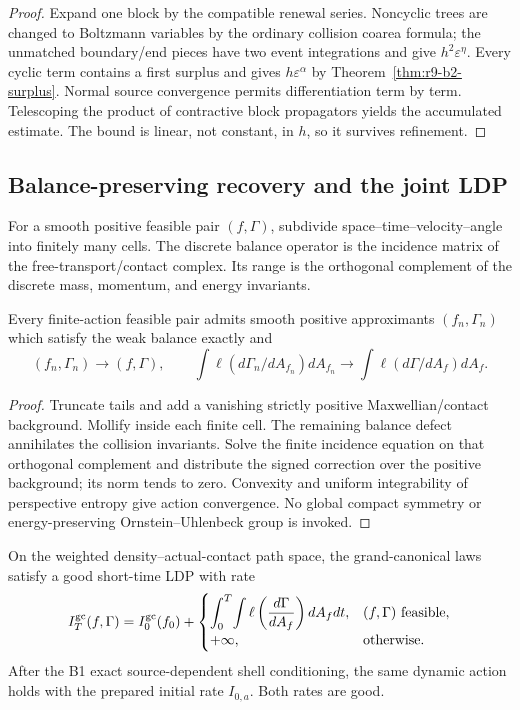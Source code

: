 \begin{proof}
Expand one block by the compatible renewal series.  Noncyclic trees are
changed to Boltzmann variables by the ordinary collision coarea formula; the
unmatched boundary/end pieces have two event integrations and give
$h^2\varepsilon^\eta$.  Every cyclic term contains a first surplus and gives
$h\varepsilon^\alpha$ by Theorem~\ref{thm:r9-b2-surplus}.  Normal source
convergence permits differentiation term by term.  Telescoping the product of
contractive block propagators yields the accumulated estimate.  The bound is
linear, not constant, in $h$, so it survives refinement.
\end{proof}

\subsection{Balance-preserving recovery and the joint LDP}

For a smooth positive feasible pair $(f,\Gamma)$, subdivide
space--time--velocity--angle into finitely many cells.  The discrete balance
operator is the incidence matrix of the free-transport/contact complex.  Its
range is the orthogonal complement of the discrete mass, momentum, and energy
invariants.

\begin{lemma}
\label{lem:r9-b2-repair}
Every finite-action feasible pair admits smooth positive approximants
$(f_n,\Gamma_n)$ which satisfy the weak balance exactly and
\[
 (f_n,\Gamma_n)\to(f,\Gamma),
 \qquad
 \int\ell(d\Gamma_n/dA_{f_n})dA_{f_n}\to
 \int\ell(d\Gamma/dA_f)dA_f.
\]
\end{lemma}

\begin{proof}
Truncate tails and add a vanishing strictly positive Maxwellian/contact
background.  Mollify inside each finite cell.  The remaining balance defect
annihilates the collision invariants.  Solve the finite incidence equation on
that orthogonal complement and distribute the signed correction over the
positive background; its norm tends to zero.  Convexity and uniform
integrability of perspective entropy give action convergence.  No global
compact symmetry or energy-preserving Ornstein--Uhlenbeck group is invoked.
\end{proof}

\begin{theorem}
\label{thm:r9-b2-main}
On the weighted density--actual-contact path space, the grand-canonical laws
satisfy a good short-time LDP with rate
\[
 I_T^{\rm gc}(f,\Gamma)
 =I_0^{\rm gc}(f_0)
 +\begin{cases}
 \displaystyle\int_0^T\!\int
 \ell\left(\frac{d\Gamma}{dA_f}
 \right)dA_fdt,
 & (f,\Gamma)\text{ feasible},\\
 +\infty,&\text{otherwise}.
 \end{cases}
\]
After the B1 exact source-dependent shell conditioning, the same dynamic
action holds with the prepared initial rate $I_{0,a}$.  Both rates are good.
\end{theorem}

